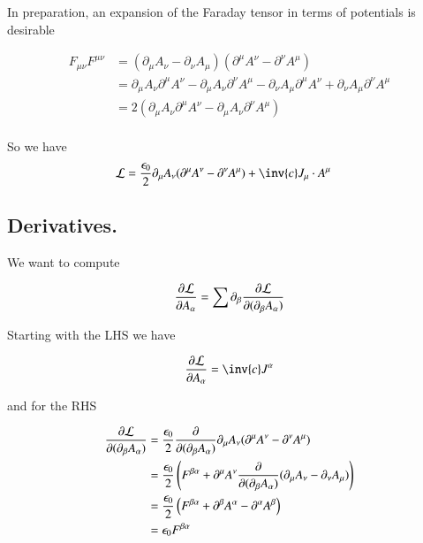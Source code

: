 In preparation, an expansion of the Faraday tensor in terms of potentials is desirable

\begin{align*}
F_{\mu\nu}F^{\mu\nu}
&=
(\partial_\mu A_\nu - \partial_\nu A_\mu) (\partial^\mu A^\nu - \partial^\nu A^\mu) \\
&=
\partial_\mu A_\nu \partial^\mu A^\nu 
-\partial_\mu A_\nu \partial^\nu A^\mu
- \partial_\nu A_\mu \partial^\mu A^\nu 
+ \partial_\nu A_\mu \partial^\nu A^\mu \\
&=
2 (\partial_\mu A_\nu \partial^\mu A^\nu - \partial_\mu A_\nu \partial^\nu A^\mu)
\\
\end{align*}

So we have
\begin{align*}
\LL &= \frac{\epsilon_0}{2} \partial_\mu A_\nu (\partial^\mu A^\nu - \partial^\nu A^\mu)
+ \inv{c} J_\mu \cdot A^\mu
\end{align*}

\subsection{Derivatives. }

We want to compute

\begin{align}
\frac{\partial {\mathcal{L}}}{\partial {A_\alpha}} = \sum \partial_\beta \frac{\partial {\mathcal{L}}}{\partial {(\partial_\beta A_\alpha)}}
\end{align}

Starting with the LHS we have

\begin{align*}
\PD{A_\alpha}{\LL} = \inv{c} J^\alpha 
\end{align*}

and for the RHS

\begin{align*}
\frac{\partial {\mathcal{L}}}{\partial {(\partial_\beta A_\alpha)}}
&=
\frac{\epsilon_0}{2} 
\frac{\partial {}}{\partial {(\partial_\beta A_\alpha)}}
\partial_\mu A_\nu (\partial^\mu A^\nu - \partial^\nu A^\mu) \\
&=
\frac{\epsilon_0}{2} 
\left(
F^{\beta\alpha}
+
\partial^\mu A^\nu 
\frac{\partial {}}{\partial {(\partial_\beta A_\alpha)}}
(\partial_\mu A_\nu - \partial_\nu A_\mu) 
\right) \\
&=
\frac{\epsilon_0}{2} 
\left(
F^{\beta\alpha}
+ \partial^\beta A^\alpha 
-\partial^\alpha A^\beta 
\right) \\
&=
{\epsilon_0} F^{\beta\alpha} \\
\end{align*}

